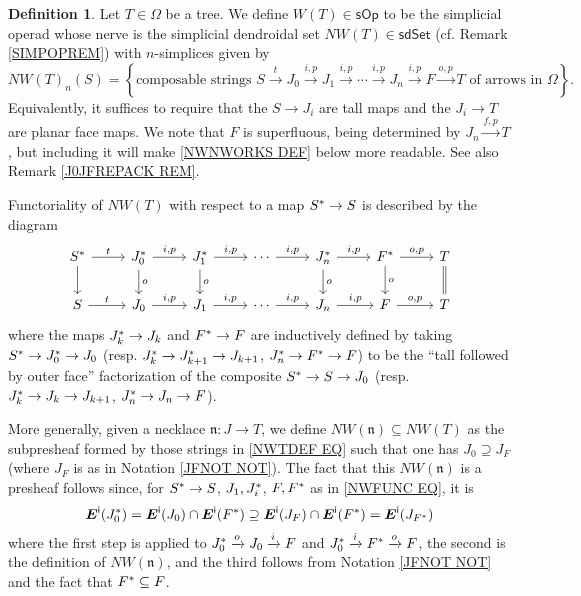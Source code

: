 \documentclass[a4paper,10pt]{article}%
\numberwithin{equation}{section}
\numberwithin{figure}{section}
\theoremstyle{definition} %
\newtheorem{definition}[equation]{Definition}%
\begin{document}
\begin{definition}\label{NWTNS DEF}
	Let $T \in \Omega$ be a tree.
	We define 
	$W(T) \in \mathsf{sOp}$
	to be the simplicial operad whose nerve is the 
	simplicial dendroidal set 
	$NW(T) \in \mathsf{sdSet}$
	(cf. Remark \ref{SIMPOPREM})
	with $n$-simplices given by
\begin{equation}\label{NWTDEF EQ}
	NW(T)_n(S)
=
	\left\{
	\text{composable strings }
	S \xrightarrow{t} 
	J_0 \xrightarrow{i,p} 
	J_1 \xrightarrow{i,p} 
	\cdots \xrightarrow{i,p}
	J_n \xrightarrow{i,p}
	F \xrightarrow{o,p}
	T
	\text{ of arrows in $\Omega$}
	\right\}.
\end{equation}
	Equivalently, 
	it suffices to require that the
	$S \to J_i$ are tall maps
	and the $J_i \to T$ are planar face maps.
	We note that $F$ is superfluous, 
	being determined by $J_n \xrightarrow{f,p} T$,
	but including it will make \eqref{NWNWORKS DEF} 
	below more readable.
	See also Remark \ref{J0JFREPACK REM}.

	Functoriality of 
	$NW(T)$
	with respect to a map $S^{\**} \to S$
	is described by the diagram
\begin{equation}\label{NWFUNC EQ}
\begin{tikzcd}
	S^{\**} \ar{r}{t} \ar{d}
&
	J^{\**}_0 \ar{r}{i,p} \ar{d}{o}
&
	J^{\**}_1 \ar{r}{i,p} \ar{d}{o}
&
	\cdots \ar{r}{i,p}
&
	J^{\**}_n \ar{r}{i,p} \ar{d}{o}
&
	F^{\**} \ar{r}{o,p} \ar{d}{o}
&
	T \ar[equal]{d}
\\
	S \ar{r}{t} 
&
	J_0 \ar{r}{i,p}
&
	J_1 \ar{r}{i,p}
&
	\cdots \ar{r}{i,p}
&
	J_n \ar{r}{i,p}
&
	F \ar{r}{o,p}
&
	T	
\end{tikzcd}
\end{equation}
	where the maps $J^{\**}_k \to J_k$ and 
	$F^{\**} \to F$
	are inductively defined by taking
	$S^{\**} \to J^{\**}_0 \to J_0$
	(resp. $J^{\**}_k \to J^{\**}_{k+1} \to J_{k+1}$,
	$J^{\**}_n \to F^{\**} \to F$)
	to be the ``tall followed by outer face''
	factorization of the composite
	$S^{\**} \to S \to J_0$
	(resp. $J^{\**}_k \to J_{k} \to J_{k+1}$,
	$J^{\**}_n \to J_n \to F$).

	More generally, 
	given a necklace $\mathfrak{n}\colon J \to T$,
	we define
	$NW(\mathfrak{n}) \subseteq NW(T)$
	as the subpresheaf formed by those strings in 
	\eqref{NWTDEF EQ} such that
	one has $J_0 \supseteq J_{F}$
	(where $J_{F}$ is as in Notation \ref{JFNOT NOT}).
	The fact that this $NW(\mathfrak{n})$ is a presheaf follows 
	since, for $S^{\**} \to S$, 
	$J_1,J_i^{\**}$, $F,F^{\**}$ as in \eqref{NWFUNC EQ},
	it is
\begin{equation}\label{NWNWORKS DEF}
	\boldsymbol{E}^{\mathsf{i}}(J^{\**}_0)
=
	\boldsymbol{E}^{\mathsf{i}}(J_0)
	\cap
	\boldsymbol{E}^{\mathsf{i}}(F^{\**})
\supseteq
	\boldsymbol{E}^{\mathsf{i}}(J_{F})
	\cap
	\boldsymbol{E}^{\mathsf{i}}(F^{\**})
=
	\boldsymbol{E}^{\mathsf{i}}(J_{F^{\**}})
\end{equation}
where the first step is 
\cite[Lemma 2.5]{BP_edss}
applied to 
$J^{\**}_0 \xrightarrow{o} J_0 \xrightarrow{i} F$
and 
$J^{\**}_0 \xrightarrow{i} 
F^{\**} \xrightarrow{o}
F$,
the second is the definition of $NW(\mathfrak{n})$,
and the third follows from Notation \ref{JFNOT NOT}
and the fact that $F^{\**} \subseteq F$.
\end{definition}
\end{document}
